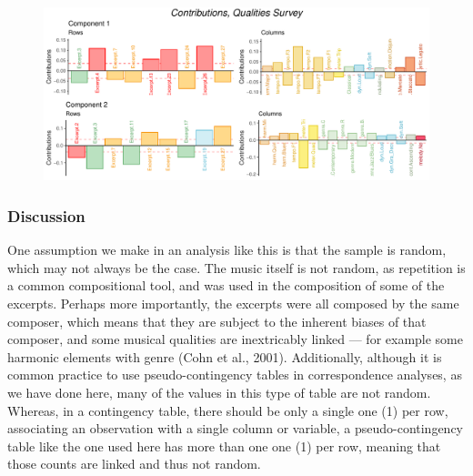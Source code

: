 \documentclass[
  english,
  man,floatsintext]{apa6}
\begin{document}
\begin{figure}

{\centering \includegraphics{Music-Descriptor-Space_files/figure-latex/contributionsQ-1} 

}

\caption{ }\label{fig:contributionsQ}
\end{figure}

\hypertarget{discussion}{%
\subsubsection{Discussion}\label{discussion}}

One assumption we make in an analysis like this is that the sample is random, which may not always be the case. The music itself is not random, as repetition is a common compositional tool, and was used in the composition of some of the excerpts. Perhaps more importantly, the excerpts were all composed by the same composer, which means that they are subject to the inherent biases of that composer, and some musical qualities are inextricably linked --- for example some harmonic elements with genre (Cohn et al., 2001). Additionally, although it is common practice to use pseudo-contingency tables in correspondence analyses, as we have done here, many of the values in this type of table are not random. Whereas, in a contingency table, there should be only a single one (1) per row, associating an observation with a single column or variable, a pseudo-contingency table like the one used here has more than one one (1) per row, meaning that those counts are linked and thus not random.
\end{document}
